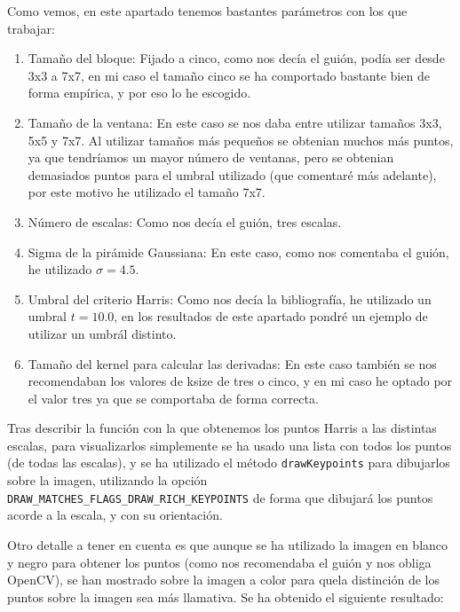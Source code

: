 \documentclass[12pt, spanish]{article}
\begin{document}
Como vemos, en este apartado tenemos bastantes parámetros con los que trabajar:

\begin{enumerate}
	\item Tamaño del bloque: Fijado a cinco, como nos decía el guión, podía ser desde 3x3 a 7x7, en mi caso el tamaño cinco se ha comportado bastante bien de forma empírica, y por eso lo he escogido.
	\item Tamaño de la ventana: En este caso se nos daba entre utilizar tamaños 3x3, 5x5 y 7x7. Al utilizar tamaños más pequeños se obtenian muchos más puntos, ya que tendríamos un mayor número de ventanas, pero se obtenian demasiados puntos para el umbral utilizado (que comentaré más adelante), por este motivo he utilizado el tamaño 7x7.
	\item Número de escalas: Como nos decía el guión, tres escalas.
	\item Sigma de la pirámide Gaussiana: En este caso, como nos comentaba el guión, he utilizado $\sigma = 4.5$.
	\item Umbral del criterio Harris: Como nos decía la bibliografía\cite{harris}, he utilizado un umbral $t = 10.0$, en los resultados de este apartado pondré un ejemplo de utilizar un umbrál distinto.
	\item Tamaño del kernel para calcular las derivadas: En este caso también se nos recomendaban los valores de ksize de tres o cinco, y en mi caso he optado por el valor tres ya que se comportaba de forma correcta.
\end{enumerate}

Tras describir la función con la que obtenemos los puntos Harris a las distintas escalas, para visualizarlos simplemente se ha usado una lista con todos los puntos (de todas las escalas), y se ha utilizado el método \texttt{drawKeypoints}\cite{drawKeypoints} para dibujarlos sobre la imagen, utilizando la opción\\  \texttt{DRAW\_MATCHES\_FLAGS\_DRAW\_RICH\_KEYPOINTS} de forma que dibujará los puntos acorde a la escala, y con su orientación.

Otro detalle a tener en cuenta es que aunque se ha utilizado la imagen en blanco y negro para obtener los puntos (como nos recomendaba el guión y nos obliga OpenCV), se han mostrado sobre la imagen a color para quela distinción de los puntos sobre la imagen sea más llamativa. Se ha obtenido el siguiente resultado:
\end{document}
